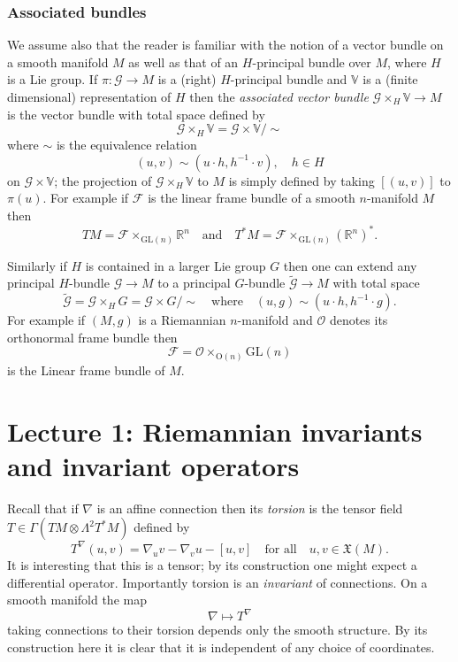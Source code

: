 \documentclass[a4paper,12pt]{amsart}
\theoremstyle{remark}
\begin{document}
\subsubsection{Associated bundles} We assume also that the reader is familiar with the notion of a vector bundle on a smooth manifold $M$ as well as that of an $H$-principal bundle over $M$, where $H$ is a Lie group. If $\pi:\mathcal{G}\rightarrow M$ is a (right) $H$-principal bundle and $\mathbb{V}$ is a (finite dimensional) representation of $H$ then the \emph{associated vector bundle} $\mathcal{G}\times_H \mathbb{V} \rightarrow M$ is the vector bundle with total space defined by
$$
\mathcal{G}\times_H \mathbb{V} = \mathcal{G}\times \mathbb{V} /\sim
$$
where $\sim$ is the equivalence relation 
$$
(u,v) \sim (u\cdot h,h^{-1}\cdot v), \quad h\in H
$$
on $\mathcal{G}\times \mathbb{V}$; the projection of $\mathcal{G}\times_H \mathbb{V}$ to $M$ is simply defined by taking $[(u,v)]$ to $\pi(u)$. For example if $\mathcal{F}$ is the linear frame bundle of a smooth $n$-manifold $M$ then
$$
TM = \mathcal{F}\times_{\mathrm{GL}(n)} \mathbb{R}^n \quad \mbox{and} \quad T^*M = \mathcal{F}\times_{\mathrm{GL}(n)} (\mathbb{R}^n)^*.
$$

Similarly if $H$ is contained in a larger Lie group $G$ then one can extend any principal $H$-bundle $\mathcal{G}\rightarrow M$ to a principal $G$-bundle $\tilde{\mathcal{G}}\rightarrow M$ with total space
$$
\tilde{\mathcal{G}}= \mathcal{G}\times_H G = \mathcal{G}\times G/\sim \quad \mbox{where} \quad (u,g) \sim (u\cdot h,h^{-1}\cdot g).
$$
For example if $(M,g)$ is a Riemannian $n$-manifold and $\mathcal{O}$ denotes its orthonormal frame bundle then
$$
\mathcal{F} = \mathcal{O}\times_{\mathrm{O}(n)}\mathrm{GL}(n)
$$
is the Linear frame bundle of $M$.

\section{Lecture 1: Riemannian invariants and invariant operators}\label{L1}

Recall that if $\nabla$ is an affine connection then its {\em torsion} is the tensor field 
$T\in \Gamma (TM\otimes \Lambda^2 T^*M) $ defined by  
$$
T^{\nabla}(u,v) = \nabla_u v-\nabla_v u -[u,v] \quad \mbox{for all} \quad u,v\in \mathfrak{X}(M).
$$
It is interesting that this is a
tensor; by its construction one might expect a differential operator.
Importantly torsion is an {\em invariant} of connections. On a smooth manifold the map
$$
\nabla\mapsto T^\nabla
$$ 
taking connections to their torsion depends only the smooth
structure. By its construction here it is clear that it is independent
of any choice of coordinates. 
\end{document}
